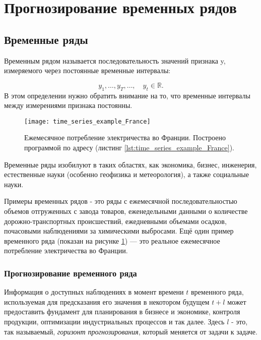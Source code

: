 \section{Прогнозирование временных рядов}

\subsection{Временные ряды}

Временным рядом называется последовательность значений признака y, измеряемого 
через постоянные временные интервалы:

\begin{equation*}
    y_1, \dots, y_T, \dots, \quad y_t \in \mathbb{R}.
\end{equation*}
В этом определении нужно обратить внимание на то, что временные интервалы между 
измерениями признака постоянны.\\[-0.5em]

\begin{figure}[h!]
    \centering
    \texttt{[image: time\_series\_example\_France]}
    \caption{Ежемесячное потребление электричества во Франции. 
    Построено программой по адресу (листинг \ref{lst:time_series_example_France}).}
    \label{fig:time_series_example_France}
\end{figure}

Временные ряды изобилуют в таких
областях, как экономика, бизнес, инженерия, естественные науки 
(особенно геофизика и метеорология), а также социальные науки.

Примеры временных рядов - это ряды с  
ежемесячной последовательностью объемов отгруженных с завода товаров, 
еженедельными данными о количестве дорожно-транспортных происшествий, 
ежедневными объемами осадков, почасовыми наблюдениями за химическими 
выбросами. Ещё один пример временного ряда 
(показан на рисунке \ref{fig:time_series_example_France}) — это реальное 
ежемесячное потребление электричества во Франции.

\subsubsection{Прогнозирование временного ряда}

Информация о доступных наблюдениях в момент времени $t$ временного ряда, 
используемая для предсказания его значения в некотором будущем $t+l$ может 
предоставить фундамент для планирования в бизнесе и экономике, контроля продукции, 
оптимизации индустриальных процессов и так далее. Здесь $l$ - это, так называемый, 
\textit{горизонт прогнозирования}, который меняется от задачи к задаче.

